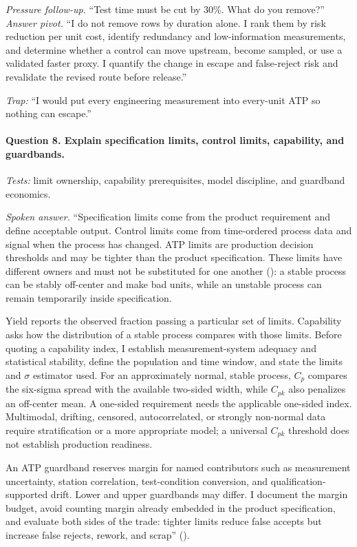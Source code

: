 \textit{Pressure follow-up.} ``Test time must be cut by 30\%. What do you
remove?''\\
\textit{Answer pivot.} ``I do not remove rows by duration alone. I rank them by
risk reduction per unit cost, identify redundancy and low-information
measurements, and determine whether a control can move upstream, become
sampled, or use a validated faster proxy. I quantify the change in escape and
false-reject risk and revalidate the revised route before release.''

\textit{Trap:} ``I would put every engineering measurement into every-unit ATP
so nothing can escape.''

\paragraph{Question 8. Explain specification limits, control limits,
capability, and guardbands.}
\textit{Tests:} limit ownership, capability prerequisites, model discipline,
and guardband economics.

\textit{Spoken answer.}
``Specification limits come from the product requirement and define acceptable
output. Control limits come from time-ordered process data and signal when the
process has changed. ATP limits are production decision thresholds and may be
tighter than the product specification. These limits have different owners and
must not be substituted for one another
(): a stable process can be stably off-center and
make bad units, while an unstable process can remain temporarily inside
specification.

Yield reports the observed fraction passing a particular set of limits.
Capability asks how the distribution of a stable process compares with those
limits. Before quoting a capability index, I establish measurement-system
adequacy and statistical stability, define the population and time window, and
state the limits and $\sigma$ estimator used. For an approximately normal,
stable process, $C_p$ compares the six-sigma spread with the available
two-sided width, while $C_{pk}$ also penalizes an off-center mean. A one-sided
requirement needs the applicable one-sided index. Multimodal, drifting,
censored, autocorrelated, or strongly non-normal data require stratification or
a more appropriate model; a universal $C_{pk}$ threshold does not establish
production readiness.

An ATP guardband reserves margin for named contributors such as measurement
uncertainty, station correlation, test-condition conversion, and
qualification-supported drift. Lower and upper guardbands may differ. I
document the margin budget, avoid counting margin already embedded in the
product specification, and evaluate both sides of the trade: tighter limits
reduce false accepts but increase false rejects, rework, and scrap''
().


